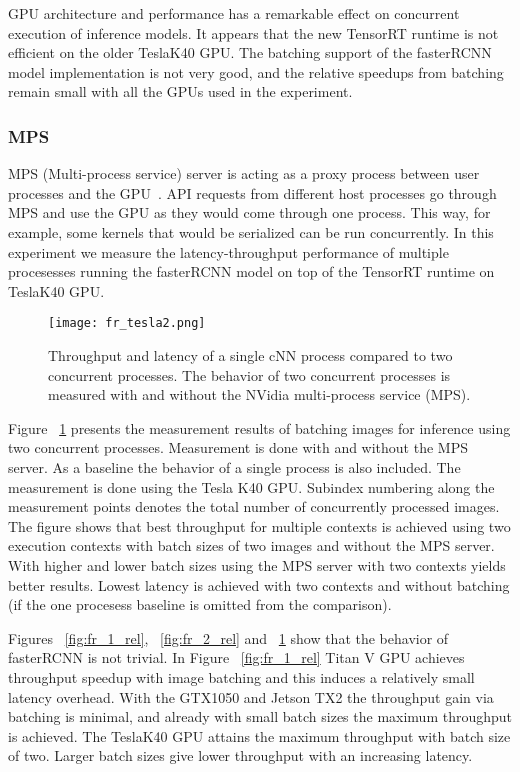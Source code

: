 \documentclass[sigconf]{acmart}
\begin{document}
GPU architecture and performance has a remarkable effect on concurrent execution of inference models. It appears that the new TensorRT runtime is not efficient on the older TeslaK40 GPU. The batching support of the fasterRCNN model implementation is not very good, and the relative speedups from batching remain small with all the GPUs used in the experiment.

\subsubsection{MPS}

MPS (Multi-process service) server is acting as a proxy process between user processes and the GPU~\cite{mps}. API requests from different host processes go through MPS and use the GPU as they would come through one process. This way, for example, some kernels that would be serialized can be run concurrently. In this experiment we measure the latency-throughput performance of multiple procesesses running the fasterRCNN model on top of the TensorRT runtime on TeslaK40 GPU.

\begin{figure}[t]
\centering
\texttt{[image: fr\_tesla2.png]}
\caption{Throughput and latency of a single cNN process compared to two concurrent processes. The behavior of two concurrent processes is measured with and without the NVidia multi-process service (MPS).}
\label{fig:fr_tesla}
\end{figure}

Figure ~\ref{fig:fr_tesla} presents the measurement results of batching images for inference using two concurrent processes. Measurement is done with and without the MPS server. As a baseline the behavior of a single process is also included. The measurement is done using the Tesla K40 GPU. Subindex numbering along the measurement points denotes the total number of concurrently processed images. The figure shows that best throughput for multiple contexts is achieved using two execution contexts with batch sizes of two images and without the MPS server. With higher and lower batch sizes using the MPS server with two contexts yields better results. Lowest latency is achieved with two contexts and without batching (if the one procesess baseline is omitted from the comparison).

Figures ~\ref{fig:fr_1_rel}, ~\ref{fig:fr_2_rel} and ~\ref{fig:fr_tesla} show that the behavior of fasterRCNN is not trivial. In Figure ~\ref{fig:fr_1_rel} Titan V GPU achieves throughput speedup with image batching and this induces a relatively small latency overhead. With the GTX1050 and Jetson TX2 the throughput gain via batching is minimal, and already with small batch sizes the maximum throughput is achieved. The TeslaK40 GPU attains the maximum throughput with batch size of two. Larger batch sizes give lower throughput with an increasing latency.
\end{document}
